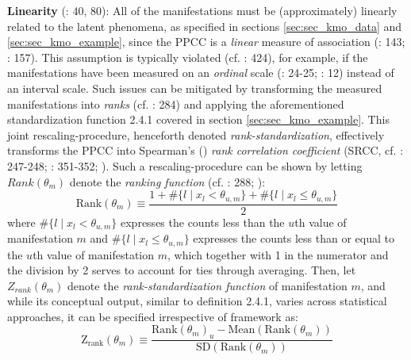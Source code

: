 \documentclass[
  10pt,
  a4paper,
  twoside]{article}
\begin{document}
\textbf{Linearity} (: 40, 80): All of the manifestations must be (approximately) linearly related to the latent phenomena, as specified in sections \ref{sec:sec_kmo_data} and \ref{sec:sec_kmo_example}, since the PPCC is a \emph{linear} measure of association (: 143; : 157). This assumption is typically violated (cf. : 424), for example, if the manifestations have been measured on an \emph{ordinal} scale (: 24-25; : 12) instead of an interval scale. Such issues can be mitigated by transforming the measured manifestations into \emph{ranks} (cf. : 284) and applying the aforementioned standardization function 2.4.1 covered in section \ref{sec:sec_kmo_example}. This joint rescaling-procedure, henceforth denoted \emph{rank-standardization}, effectively transforms the PPCC into Spearman's () \emph{rank correlation coefficient} (SRCC, cf. : 247-248; : 351-352; ). Such a rescaling-procedure can be shown by letting \(Rank(\theta_m)\) denote the \emph{ranking function} (cf. : 288; ):
\[
\text{Rank}(\theta_m) \equiv \frac{1 + \#\{ l \mid x_l < \theta_{u,m} \} + \#\{ l \mid x_l \le \theta_{u,m} \}}{2} \tag{2.6.1}
\]
where \(\#\{ l \mid x_l < \theta_{u,m} \}\) expresses the counts less than the \(u\)th value of manifestation \(m\) and \(\#\{ l \mid x_l \le \theta_{u,m} \}\) expresses the counts less than or equal to the \(u\)th value of manifestation \(m\), which together with 1 in the numerator and the division by 2 serves to account for ties through averaging. Then, let \(Z_{rank}(\theta_m)\) denote the \emph{rank-standardization function} of manifestation \(m\), and while its conceptual output, similar to definition 2.4.1, varies across statistical approaches, it can be specified irrespective of framework as:
\[
\text{Z}_\text{rank}(\theta_m) \equiv \frac{\text{Rank}(\theta_m)_u - \text{Mean}(\text{Rank}(\theta_m))}{\text{SD}(\text{Rank}(\theta_m))} \tag{2.6.2}
\]
\end{document}
